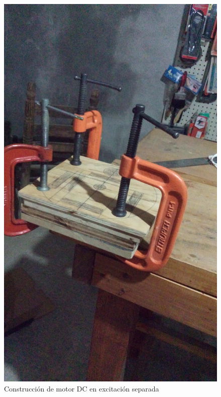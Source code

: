 \begin{figure}[!htbp]
\caption{Construcci\'on de motor DC en excitaci\'on separada}
\centering
\includegraphics [scale=0.10]
{./img/20160228_190845.jpg}
\end{figure}

